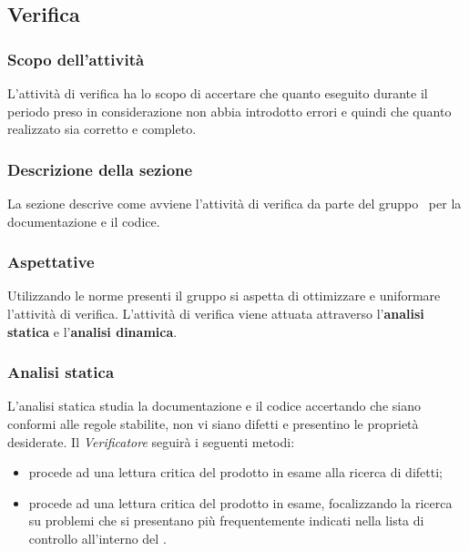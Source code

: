 \subsection{Verifica}\label{Verifica}
\subsubsection{Scopo dell'attività} \label{PSup_Verifica_Scopo}
L'attività di verifica ha lo scopo di accertare che quanto eseguito durante il periodo preso in considerazione non abbia introdotto errori e quindi che quanto realizzato sia corretto e completo.

\subsubsection{Descrizione della sezione} 
La sezione descrive come avviene l'attività di verifica da parte del gruppo \Gruppo\ per la documentazione e il codice.

\subsubsection{Aspettative}
Utilizzando le norme presenti il gruppo si aspetta di ottimizzare e uniformare l'attività di verifica. L'attività di verifica viene attuata attraverso l'\textbf{analisi statica} e l'\textbf{analisi dinamica}.

\subsubsection{Analisi statica}
L'analisi statica studia la documentazione e il codice accertando che siano conformi alle regole stabilite, non vi siano difetti e presentino le proprietà desiderate.
Il \textit{Verificatore} seguirà i seguenti metodi:
\begin{itemize}
	\item {} procede ad una lettura critica del prodotto in esame alla ricerca di difetti;
	\item {} procede ad una lettura critica del prodotto in esame, focalizzando la ricerca su problemi che si presentano più frequentemente indicati nella lista di controllo all'interno del \PdQ.
\end{itemize}

